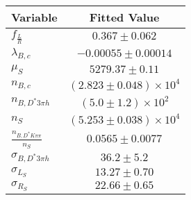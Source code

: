 \begin{tabular}[t]{lc}
\hline
Variable &Fitted Value\\
\hline\hline
$f_{\frac{L}{R}}$&$0.367\pm0.062$\\
\hline
$\lambda_{B,c}$&$-0.00055\pm0.00014$\\
\hline
$\mu_S$&$5279.37\pm0.11$\\
\hline
$n_{B,c}$&$(2.823\pm0.048)\times 10^4$\\
\hline
$n_{B,D^*3\pi h}$&$(5.0\pm1.2)\times 10^2$\\
\hline
$n_S$&$(5.253\pm0.038)\times 10^4$\\
\hline
$\frac{n_{B,D^*K\pi\pi}}{n_S}$&$0.0565\pm0.0077$\\
\hline
$\sigma_{B,D^*3\pi h}$&$36.2\pm5.2$\\
\hline
$\sigma_{L_S}$&$13.27\pm0.70$\\
\hline
$\sigma_{R_S}$&$22.66\pm0.65$\\
\hline
\end{tabular}